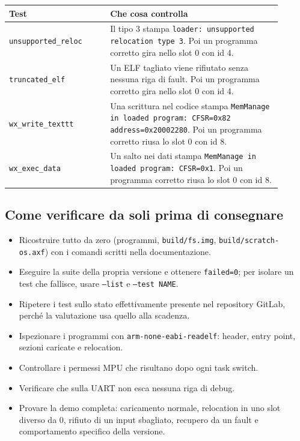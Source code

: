 \begin{center}
\small
\begin{tabular}{|p{0.33\linewidth}|p{0.57\linewidth}|}
\hline
\raggedright Test & \raggedright Che cosa controlla \tabularnewline
\hline\hline
\raggedright \texttt{unsupported\_reloc} & \raggedright Il tipo 3 stampa \texttt{loader:\ unsupported relocation type 3}. Poi un programma corretto gira nello slot 0 con id 4. \tabularnewline
\hline
\raggedright \texttt{truncated\_elf} & \raggedright Un ELF tagliato viene rifiutato senza nessuna riga di fault. Poi un programma corretto gira nello slot 0 con id 4. \tabularnewline
\hline
\raggedright \texttt{wx\_write\_texttt} & \raggedright Una scrittura nel codice stampa \texttt{MemManage in loaded program:\ CFSR=0x82 address=0x20002280}. Poi un programma corretto riusa lo slot 0 con id 8. \tabularnewline
\hline
\raggedright \texttt{wx\_exec\_data} & \raggedright Un salto nei dati stampa \texttt{MemManage in loaded program:\ CFSR=0x1}. Poi un programma corretto riusa lo slot 0 con id 8. \tabularnewline
\hline
\end{tabular}
\end{center}

\subsection{Come verificare da soli prima di consegnare}
\begin{itemize}\sloppy
\item Ricostruire tutto da zero (programmi, \texttt{build/fs.img}, \texttt{build/scratch-os.axf}) con i comandi scritti nella documentazione.
\item Eseguire la suite della propria versione e ottenere \texttt{failed=0}; per isolare un test che fallisce, usare \texttt{--list} e \texttt{--test NAME}.
\item Ripetere i test sullo stato effettivamente presente nel repository GitLab, perché la valutazione usa quello alla scadenza.
\item Ispezionare i programmi con \texttt{arm-none-eabi-readelf}: header, entry point, sezioni caricate e relocation.
\item Controllare i permessi MPU che risultano dopo ogni task switch.
\item Verificare che sulla UART non esca nessuna riga di debug.
\item Provare la demo completa: caricamento normale, relocation in uno slot diverso da 0, rifiuto di un input sbagliato, recupero da un fault e comportamento specifico della versione.
\end{itemize}

